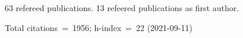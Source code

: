 63 refereed publications. 13 refeered publications as first author.

Total citations~=~1956; h-index~=~22 (2021-09-11)